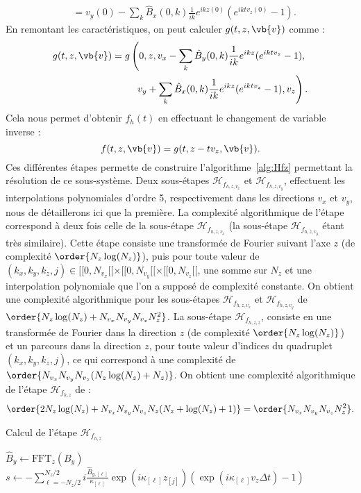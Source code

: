 \begin{itemize}
$$\begin{aligned}
               &= v_y(0) - \sum_k \hat{B}_{x} (0, k)\frac{1}{ik}e^{ik z(0)} (e^{ikt v_z(0)} -1).
      \end{aligned}
    $$
    En remontant les caractéristiques, on peut calculer $g(t,z,\vb{v})$ comme :
    $$
      \begin{aligned}
        g(t, z, \vb{v}) = g\left(0, z, v_x - \sum_k \hat{B}_{y}(0, k) \frac{1}{ik} e^{ik z}(e^{ikt v_z} -1), \right.\\
                                \left.v_y +   \sum_k \hat{B}_{x} (0, k)\frac{1}{ik} e^{ik z}(e^{ikt v_z} -1), v_z\right).  
      \end{aligned}
    $$
    Cela nous permet d'obtenir $f_h(t)$ en effectuant le changement de variable inverse :
    $$
      f(t,z,\vb{v}) = g(t,z-tv_z,\vb{v}).
    $$
    Ces différentes étapes permette de construire l'algorithme~\ref{alg:Hfz} permettant la résolution de ce sous-système. Deux sous-étapes $\mathcal{H}_{f_{h,z,v_x}}$ et $\mathcal{H}_{f_{h,z,v_y}}$, effectuent les interpolations polynomiales d'ordre 5, respectivement dans les directions $v_x$ et $v_y$, nous de détaillerons ici que la première. La complexité algorithmique de l'étape correspond à deux fois celle de la sous-étape $\mathcal{H}_{f_{h,z,v_x}}$ (la sous-étape $\mathcal{H}_{f_{h,z,v_y}}$ étant très similaire). Cette étape consiste une transformée de Fourier suivant l'axe $z$ (de complexité $\order{N_z\log(N_z)}$), puis pour toute valeur de $(k_x,k_y,k_z,j)\in[\![0,N_{v_x}[\![\times[\![0,N_{v_y}[\![\times[\![0,N_{v_z}[\![$, une somme sur $N_z$ et une interpolation polynomiale que l'on a supposé de complexité constante. On obtient une complexité algorithmique pour les sous-étapes $\mathcal{H}_{f_{h,z,v_x}}$ et $\mathcal{H}_{f_{h,z,v_y}}$ de $\order{N_z\log(N_z)+N_{v_x}N_{v_y}N_{v_z}N_z^2}$. La sous-étape $\mathcal{H}_{f_{h,z,z}}$, consiste en une transformée de Fourier dans la direction $z$ (de complexité $\order{N_z\log(N_z)}$) et un parcours dans la direction $z$, pour toute valeur d'indices du quadruplet $(k_x,k_y,k_z,j)$, ce qui correspond à une complexité de $\order{N_{v_x}N_{v_y}N_{v_z}(N_z\log(N_z)+N_z)}$. On obtient une complexité algorithmique de l'étape $\mathcal{H}_{f_{h,z}}$ de :
    $$
      \order{2N_z\log(N_z) + N_{v_x}N_{v_y}N_{v_z}N_z(N_z + \log(N_z) + 1)}=\order{N_{v_x}N_{v_y}N_{v_z}N_z^2}.
    $$
    \begin{algorithm}
      \caption{Calcul de l'étape $\mathcal{H}_{f_{h,z}}$}
      \label{alg:Hfz}
      \begin{algorithmic}[1]
          \State $\hat{B}_y \gets \text{FFT}_z(B_y)$
          \ForAll{$(k_x,k_y,k_z)\in[\![0,N_{v_x}[\![\times[\![0,N_{v_y}[\![\times[\![0,N_{v_z}[\![$}
              \State $s \gets -\sum_{\ell=-N_z/2}^{N_z/2} i\frac{\hat{B}_{y,[\ell]}}{\kappa_{[\ell]}}\exp(i\kappa_{[\ell]}z_{[j]})(\exp(i\kappa_{[\ell]}v_z\Delta t) - 1)$


\end{algorithmic}
\end{algorithm}
\end{itemize}
